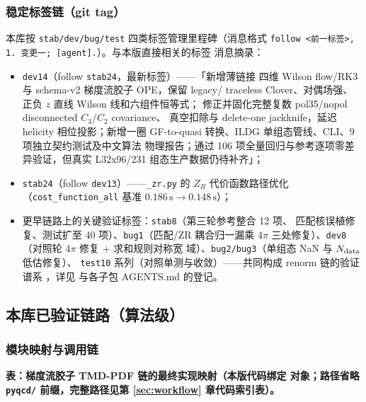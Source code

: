 \documentclass[11pt,a4paper]{ctexart}
\newcommand{\code}[1]{\texttt{#1}}
\newcommand{\pathref}[1]{\path{#1}}
\begin{document}
\subsubsection{稳定标签链（git tag）}

本库按 \code{stab/dev/bug/test} 四类标签管理里程碑（消息格式
\code{follow <前一标签>, 1. 变更一; [agent].}）。与本版直接相关的标签
消息摘录：
\begin{itemize}
  \item \code{dev14}（follow \code{stab24}，最新标签）——「新增薄链接
  四维 Wilson flow/RK3 与 schema-v2 梯度流胶子 OPE，保留 legacy/
  traceless Clover、对偶场强、正负 $z$ 直线 Wilson 线和六组件恒等式；
  修正并固化完整复数 pol35/nopol disconnected $C_3/C_2$ covariance、
  真空扣除与 delete-one jackknife，延迟 helicity 相位投影；新增一圈
  GF-to-quasi 转换、ILDG 单组态管线、CLI、9 项独立契约测试及中文算法
  物理报告；通过 106 项全量回归与参考逐项零差异验证，但真实
  L32x96/231 组态生产数据仍待补齐」；
  \item \code{stab24}（follow \code{dev13}）——\code{\_zr.py} 的
  $Z_R$ 代价函数路径优化（\code{cost\_function\_all} 基准
  $0.186\,\mathrm{s}\to0.148\,\mathrm{s}$）；
  \item 更早链路上的关键验证标签：\code{stab8}（第三轮参考整合 12 项、
  匹配核误植修复、测试扩至 40 项）、\code{bug1}（匹配/ZR 耦合归一漏乘
  $4\pi$ 三处修复）、\code{dev8}（对照轮 4$\pi$ 修复 + 求和规则对称宽
  域）、\code{bug2/bug3}（单组态 NaN 与 $N_{\rm data}$ 低估修复）、
  \code{test10} 系列（对照单测与收敛）——共同构成 renorm 链的验证谱系
  ，详见 \pathref{AGENTS.md} 与各子包 AGENTS.md 的登记。
\end{itemize}

\subsection{本库已验证链路（算法级）}

\subsubsection{模块映射与调用链}

\noindent\textbf{表：梯度流胶子 TMD-PDF 链的最终实现映射（本版代码绑定
对象；路径省略 \code{pyqcd/} 前缀，完整路径见第 \ref{sec:workflow}
章代码索引表）。}
\end{document}
